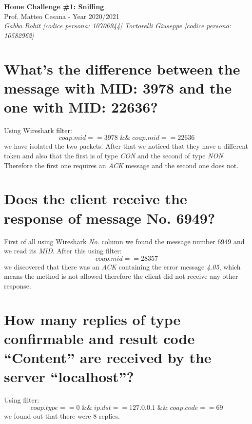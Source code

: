 \documentclass{article}
\begin{document}
\begin{titlepage}
   \begin{center}
      \Huge\textbf{Home Challenge \#1: Sniffing}\\
      \vspace{5mm} %
      \Large Prof. Matteo Cesana - Year 2020/2021\\
      \vspace{5mm} %
      \large\textit{Gabba Rohit [codice persona: 10706944]}
      \linebreak
      \large\textit{Tortorelli Giuseppe [codice persona: 10582962]}
   \end{center}
\end{titlepage}
\printindex


\section{What’s the difference between the message with MID:
3978 and the one with MID: 22636?}
Using Wireshark filter: \[ coap.mid == 3978 \; \&\&  \; coap.mid == 22636 \] we have isolated the two packets. After that we noticed that they have a different token and also that the first is of type \textit{CON} and the second of type \textit{NON}. Therefore the first one requires an \textit{ACK} message and the second one does not.

\section{Does the client receive the response of message No.
6949?}
First of all using Wireshark \textit{No.} column we found the message number 6949 and we read its \textit{MID}. After this using filter: \[ coap.mid == 28357 \] we discovered that there was an \textit{ACK} containing the error message \textit{4.05}, which means the method is not allowed therefore the client did not receive any other response.

\section{How many replies of type confirmable and result code
“Content” are received by the server “localhost”?}
Using filter: \[ coap.type == 0 \; \&\&  \; ip.dst == 127.0.0.1 \; \&\& \; coap.code == 69 \] we found out that there were 8 replies.
\end{document}

